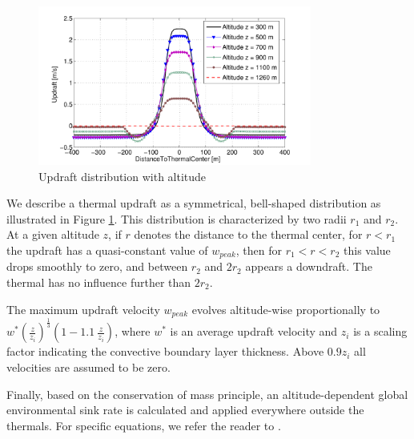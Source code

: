 \documentclass[a4paper, 10pt, conference]{ieeeconf}
\begin{document}

\begin{figure}%
\begin{center}
 \includegraphics[width=9cm]{img/total_updraft.pdf}
\end{center}
 \caption{Updraft distribution with altitude}
 \label{fig:updraft_distribution}
\end{figure}


We describe a thermal updraft as a symmetrical, bell-shaped distribution as illustrated in Figure \ref{fig:updraft_distribution}. This distribution is characterized by two radii $r_1$ and $r_2$. At a given altitude $z$, if $r$ denotes the distance to the thermal center, for $r<r_1$ the updraft has a quasi-constant value of $w_{peak}$, then for $r_1<r<r_2$ this value drops smoothly to zero, and between $r_2$ and $2r_2$ appears a downdraft. The thermal has no influence further than $2r_2$.

The maximum updraft velocity $w_{peak}$ evolves altitude-wise proportionally to $w^* \left( \frac{z}{z_i} \right)^{\frac{1}{3}} \left(1 - 1.1 \ \frac{z}{z_i}\right)$, where $w^*$ is an average updraft velocity and $z_i$ is a scaling factor indicating the convective boundary layer thickness.
Above $0.9z_i$ all velocities are assumed to be zero.

Finally, based on the conservation of mass principle, an altitude-dependent global environmental sink rate is calculated and applied everywhere outside the thermals. For specific equations, we refer the reader to \cite{allen_thermal}.
\end{document}
